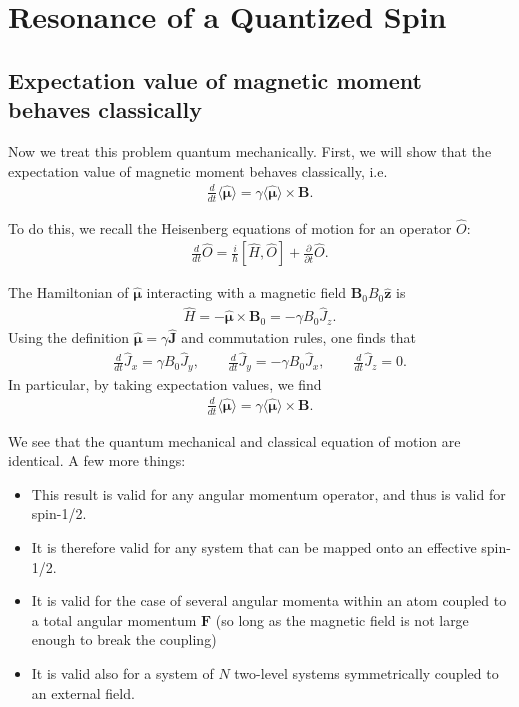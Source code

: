 \documentclass{book}
\theoremstyle{definition}
\newcommand{\p}{\partial}
\newcommand{\f}[2]{\frac{#1}{#2}}
\begin{document}
\section{Resonance of a Quantized Spin}




\subsection{Expectation value of magnetic moment behaves classically}


Now we treat this problem quantum mechanically. First, we will show that the expectation value of magnetic moment behaves classically, i.e. 
\begin{align*}
	\f{d}{dt}\langle \hat{\bm{\mu}} \rangle = \gamma \langle \hat{\bm{\mu}}\rangle \times \bm{B}.
\end{align*}

To do this, we recall the Heisenberg equations of motion for an operator $\hat{O}$:
\begin{align*}
	\f{d}{dt}\hat{O} = \f{i}{\hbar}[\hat{H}, \hat{O}] + \f{\p}{\p t}\hat{O}.
\end{align*}

The Hamiltonian of $\hat{\bm{\mu}}$ interacting with a magnetic field $\bm{B}_0  B_0 \hat{\bm{z}}$ is
\begin{align*}
	\hat{H} = -\hat{\bm{\mu}} \times \bm{B}_0 = -\gamma B_0 \hat{J}_z.
\end{align*}
Using the definition $\hat{\bm{\mu}} = \gamma \hat{\bm{J}}$ and commutation rules, one finds that 
\begin{align*}
	\f{d}{dt}\hat{J}_x = \gamma B_0 \hat{J}_y, \quad\quad \f{d}{dt}\hat{J}_y = -\gamma B_0 \hat{J}_x, \quad\quad \f{d}{dt}\hat{J}_z = 0.
\end{align*}
In particular, by taking expectation values, we find 
\begin{align*}
	\f{d}{dt}\langle \hat{\bm{\mu}} \rangle = \gamma \langle \hat{\bm{\mu}}\rangle \times \bm{B}.
\end{align*}


We see that the quantum mechanical and classical equation of motion are identical. A few more things:
\begin{itemize}
	\item This result is valid for any angular momentum operator, and thus is valid for spin-1/2.
	
	\item It is therefore valid for any system that can be mapped onto an effective spin-1/2.
	
	\item It is valid for the case of several angular momenta within an atom coupled to a total angular momentum $\bm{F}$ (so long as the magnetic field is not large enough to break the coupling)
	
	\item It is valid also for a system of $N$ two-level systems symmetrically coupled to an external field. 
\end{itemize}
\end{document}
